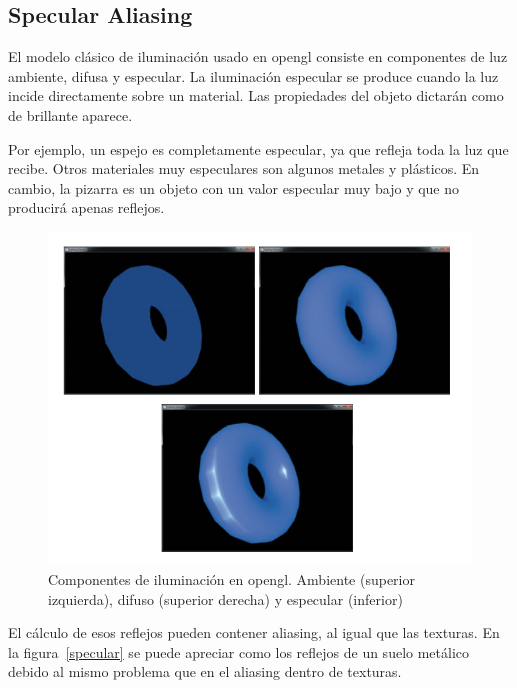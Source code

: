 \documentclass[withindex, glossary]{cam-thesis}
\begin{document}
\subsection{Specular Aliasing}

El modelo clásico de iluminación usado en \Gls{opengl} consiste en componentes de luz ambiente, difusa y especular\cite{Shreiner:2013:OPG:2544032}. La iluminación especular se produce cuando la luz incide directamente sobre un material. Las propiedades del objeto dictarán como de brillante aparece.

Por ejemplo, un espejo es completamente especular, ya que refleja toda la luz que recibe. Otros materiales muy especulares son algunos metales y plásticos. En cambio, la pizarra es un objeto con un valor especular muy bajo y que no producirá apenas reflejos.

\begin{figure}[!htbp]
    \centering
    \includegraphics[width=.8\linewidth]{figures/iluminacion.png}
    \caption{Componentes de iluminación en \Gls{opengl}\@. Ambiente (superior izquierda), difuso (superior derecha) y especular (inferior)\cite{Shreiner:2013:OPG:2544032}}
    \label{gls}
\end{figure}

El cálculo de esos reflejos pueden contener aliasing, al igual que las texturas. En la figura~\ref{specular} se puede apreciar como los reflejos de un suelo metálico debido al mismo problema que en el aliasing dentro de texturas.
\end{document}
